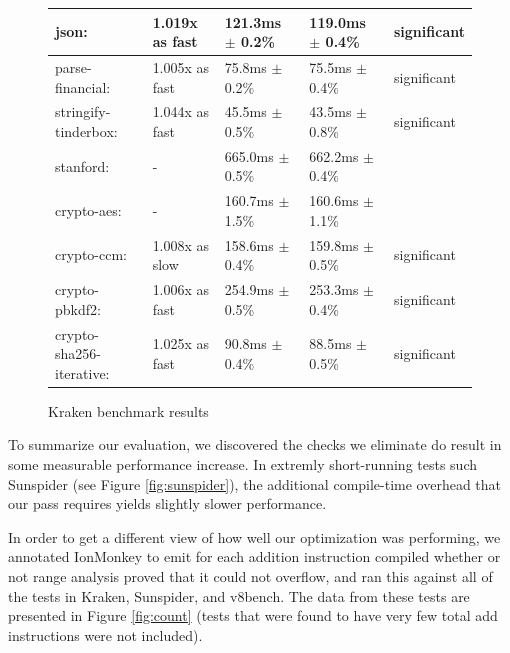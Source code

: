 \documentclass{article}
\begin{document}
\begin{figure}[H]
\begin{tabular}{|l|l|l|l|l|}
\hline\hline
      json:                     & 1.019x as fast   &  121.3ms $\pm$ 0.2\% &   119.0ms $\pm$ 0.4\%  &   significant\\
\hline\hspace{0.5em} parse-financial:        & 1.005x as fast   &   75.8ms $\pm$ 0.2\% &    75.5ms $\pm$ 0.4\%  &   significant\\
\hline\hspace{0.5em} stringify-tinderbox:    & 1.044x as fast   &   45.5ms $\pm$ 0.5\% &    43.5ms $\pm$ 0.8\%  &   significant\\
\hline\hline
      stanford:                 & -                &  665.0ms $\pm$ 0.5\% &   662.2ms $\pm$ 0.4\%  &\\
\hline\hspace{0.5em} crypto-aes:             & -                &  160.7ms $\pm$ 1.5\% &   160.6ms $\pm$ 1.1\%  &\\
\hline\hspace{0.5em} crypto-ccm:             & 1.008x as slow &  158.6ms $\pm$ 0.4\% &   159.8ms $\pm$ 0.5\%  &   significant\\
\hline\hspace{0.5em} crypto-pbkdf2:          & 1.006x as fast   &  254.9ms $\pm$ 0.5\% &   253.3ms $\pm$ 0.4\%  &   significant\\
\hline\hspace{0.5em} crypto-sha256-iterative:& 1.025x as fast   &   90.8ms $\pm$ 0.4\% &    88.5ms $\pm$ 0.5\%  &   significant \\
\hline
\end{tabular}
\caption{Kraken benchmark results}
\label{fig:kraken}
\end{figure}

To summarize our evaluation, we discovered the checks we eliminate do result in
some measurable performance increase. In extremly short-running tests such
Sunspider (see Figure \ref{fig:sunspider}), the additional compile-time
overhead that our pass requires yields slightly slower performance.


In order to get a different view of how well our optimization was
performing, we annotated IonMonkey to emit for each addition
instruction compiled whether or not range analysis proved that it
could not overflow, and ran this against all of the tests in Kraken,
Sunspider, and v8bench. The data from these tests are presented in Figure
\ref{fig:count} (tests that were found to have very few total add
instructions were not included).
\end{document}
